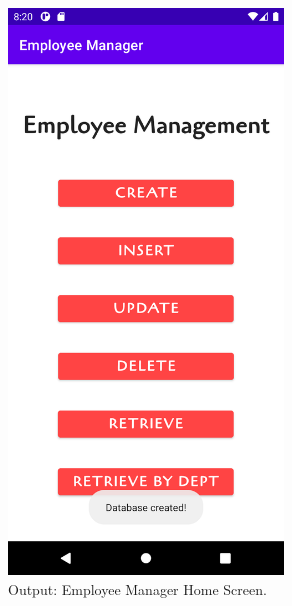 \documentclass[12pt, a4]{article}
\begin{document}
\newpage
\subsection*{}
\begin{figure}[h]
\centering
\caption{Output: Employee Manager Home Screen.}
\includegraphics[height=15cm, width=7.3cm]{EmployeeManager/Screenshots/Output-1.png}
\end{figure}

\newpage
\end{document}
